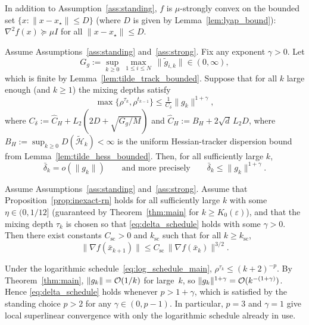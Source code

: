 \documentclass[review,onefignum,onetabnum]{siamart171218}
\begin{document}
\begin{assumption}\label{ass:strong}
In addition to Assumption~\ref{ass:standing}, $f$ is $\mu$-strongly convex on the bounded set
$\{x:\|x-x_\star\|\le D\}$ (where $D$ is given by Lemma~\ref{lem:lyap_bound}):
$\nabla^2 f(x)\succeq \mu I$ for all $\|x-x_\star\|\le D$.
\end{assumption}

\begin{lemma}\label{lem:delta_o_g}
Assume Assumptions~\ref{ass:standing} and~\ref{ass:strong}.
Fix any exponent $\gamma>0$.
Let
\[
G_g:=\sup_{k\ge 0}\ \max_{1\le i\le N}\ \|\tilde g_{i,k}\|\in(0,\infty),
\]
which is finite by Lemma~\ref{lem:tilde_track_bounded}.
Suppose that for all $k$ large enough (and $k\ge 1$) the mixing depths satisfy
\begin{equation}\label{eq:delta_schedule}
\max\{\rho^{\tau_k},\rho^{t_{k-1}}\}\le \tfrac{1}{C_\delta}\|g_k\|^{1+\gamma},
\end{equation}
where $C_\delta:=\hat C_H+L_2(2D+\sqrt{G_g/M})$ and $\hat C_H:=B_H+2\sqrt{d}\,L_2D$,
where $B_H:=\sup_{k\ge0}D(\tilde{\mathcal H}_k)<\infty$
is the uniform Hessian-tracker dispersion bound from Lemma~\ref{lem:tilde_hess_bounded}.
Then, for all sufficiently large $k$,
\[
\bar\delta_k = o(\|g_k\|)\qquad\text{and more precisely}\qquad \bar\delta_k\le \|g_k\|^{1+\gamma}.
\]
\end{lemma}

\begin{theorem}\label{thm:superlinear}
Assume Assumptions~\ref{ass:standing} and~\ref{ass:strong}.
Assume that Proposition~\ref{prop:inexact-rn} holds for all sufficiently large $k$ with some $\eta\in(0,1/12]$
(guaranteed by Theorem~\ref{thm:main} for $k\ge K_0(\varepsilon)$),
and that the mixing depth $\tau_k$ is chosen so that \eqref{eq:delta_schedule} holds with some $\gamma>0$.
Then there exist constants $C_{\mathrm{sc}}>0$ and $k_{\mathrm{sc}}$ such that for all $k\ge k_{\mathrm{sc}}$,
\[
\|\nabla f(\bar x_{k+1})\|\le C_{\mathrm{sc}}\,\|\nabla f(\bar x_k)\|^{3/2}.
\]
\end{theorem}

\begin{remark}
Under the logarithmic schedule~\eqref{eq:log_schedule_main},
$\rho^{\tau_k}\le(k+2)^{-p}$.
By Theorem~\ref{thm:main}, $\|g_k\|=\mathcal{O}(1/k)$ for large~$k$, so
$\|g_k\|^{1+\gamma}=\mathcal{O}(k^{-(1+\gamma)})$.
Hence \eqref{eq:delta_schedule} holds whenever $p>1+\gamma$,
which is satisfied by the standing choice $p>2$ for any
$\gamma\in(0,p{-}1)$.
In particular, $p=3$ and $\gamma=1$ give local superlinear
convergence with only the logarithmic schedule already in use.
\end{remark}
\end{document}
